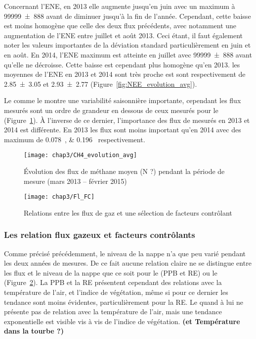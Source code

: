 Concernant l'ENE, en 2013 elle augmente jusqu'en juin avec un maximum à \SI{99999(888)}{\uml} avant de diminuer jusqu'à la fin de l'année.
Cependant, cette baisse est moins homogène que celle des deux flux précédents, avec notamment une augmentation de l'ENE entre juillet et août 2013.
Ceci étant, il faut également noter les valeurs importantes de la déviation standard particulièrement en juin et en août.
En 2014, l'ENE maximum est atteinte en juillet avec \SI{99999(888)}{\uml} avant qu'elle ne décroisse.
Cette baisse est cependant plus homogène qu'en 2013.
les moyennes de l'ENE en 2013 et 2014 sont très proche est sont respectivement de \SI{2.85(305)}{\uml} et \SI{2.93(277)}{\uml} (Figure~\ref{fig:NEE_evolution_avg}).


Le \chh comme le \coo montre une variabilité saisonnière importante, cependant les flux mesurés sont un ordre de grandeur en dessous de ceux mesurés pour le \coo (Figure~\ref{fig:CH4_evolution_avg}).
À l'inverse de ce dernier, l'importance des flux de \chh mesurés en 2013 et 2014 est différente.
En 2013 les flux sont moins important qu'en 2014 avec des maximum de \SIlist{0.078;0.196}{\uml} respectivement.

\begin{figure}
\centering
\texttt{[image: chap3/CH4\_evolution\_avg]}
\caption{Évolution des flux de méthane moyen (N ?) pendant la période de mesure (mars 2013 -- février 2015)}
\label{fig:CH4_evolution_avg}
\end{figure}

\begin{figure}
\centering
\texttt{[image: chap3/Fl\_FC]}
\caption{Relations entre les flux de gaz et une sélection de facteurs contrôlant}
\label{fig:Fl_FC}
\end{figure}

\subsubsection{Les relation flux gazeux et facteurs contrôlants}

Comme précisé précédemment, le niveau de la nappe n'a que peu varié pendant les deux années de mesures.
De ce fait aucune relation claire ne se distingue entre les flux et le niveau de la nappe que ce soit pour le \coo (PPB et RE) ou le \chh (Figure~\ref{fig:Fl_FC}).
La PPB et la RE présentent cependant des relations avec la température de l'air, et l'indice de végétation, même si pour ce dernier les tendance sont moins évidentes, particulièrement pour la RE.
Le \chh quand à lui ne présente pas de relation avec la température de l'air, mais une tendance exponentielle est visible vis à vis de l'indice de végétation.
\textbf{(\chh et Température dans la tourbe ?)}

